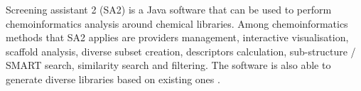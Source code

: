 Screening assistant 2 (SA2) is a Java software that can be used to perform chemoinformatics analysis around chemical libraries. Among chemoinformatics methods that SA2 applies are providers management, interactive visualisation, scaffold analysis, diverse subset creation, descriptors calculation, sub-structure / SMART search, similarity search and filtering. The software is also able to generate diverse libraries based on existing ones \cite{Guilloux_2012}.